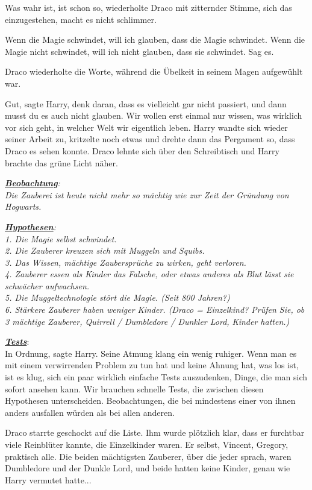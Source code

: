 \glqq{}Was wahr ist, ist schon so\grqq{}, wiederholte Draco mit zitternder
Stimme, \glqq{}sich das einzugestehen, macht es nicht schlimmer.\grqq{}

\glqq{}Wenn die Magie schwindet, will ich glauben, dass die Magie schwindet.
Wenn die Magie nicht schwindet, will ich nicht glauben, dass sie schwindet. Sag
es.\grqq{}

Draco wiederholte die Worte, während die Übelkeit in seinem Magen aufgewühlt
war.

\glqq{}Gut\grqq{}, sagte Harry, \glqq{}denk daran, dass es vielleicht gar nicht
passiert, und dann musst du es auch nicht glauben. Wir wollen erst einmal nur
wissen, was wirklich vor sich geht, in welcher Welt wir eigentlich leben.\grqq{}
Harry wandte sich wieder seiner Arbeit zu, kritzelte noch etwas und drehte dann
das Pergament so, dass Draco es sehen konnte. Draco lehnte sich über den
Schreibtisch und Harry brachte das grüne Licht näher.

\emph{\textbf{\underline{Beobachtung}}:\\
Die Zauberei ist heute nicht mehr so mächtig wie zur Zeit der Gründung von
Hogwarts.}

\emph{\textbf{\underline{Hypothesen}}:}\\
\emph{1. Die Magie selbst schwindet.\\
2. Die Zauberer kreuzen sich mit Muggeln und Squibs.\\
3. Das Wissen, mächtige Zaubersprüche zu wirken, geht verloren.\\
4. Zauberer essen als Kinder das Falsche, oder etwas anderes als Blut lässt sie
schwächer aufwachsen.\\
5. Die Muggeltechnologie stört die Magie. (Seit 800 Jahren?)\\
6. Stärkere Zauberer haben weniger Kinder. (Draco = Einzelkind? Prüfen Sie, ob 3
mächtige Zauberer, Quirrell / Dumbledore / Dunkler Lord, Kinder hatten.)}

\textbf{\emph{\underline{Tests}}}:\\
\glqq{}In Ordnung\grqq{}, sagte Harry. Seine Atmung klang ein wenig ruhiger.
\glqq{}Wenn man es mit einem verwirrenden Problem zu tun hat und keine Ahnung
hat, was los ist, ist es klug, sich ein paar wirklich einfache Tests
auszudenken, Dinge, die man sich sofort ansehen kann. Wir brauchen schnelle
Tests, die zwischen diesen Hypothesen unterscheiden. Beobachtungen, die bei
mindestens einer von ihnen anders ausfallen würden als bei allen anderen.\grqq{}

Draco starrte geschockt auf die Liste. Ihm wurde plötzlich klar, dass er
furchtbar viele Reinblüter kannte, die Einzelkinder waren. Er selbst, Vincent,
Gregory, praktisch alle. Die beiden mächtigsten Zauberer, über die jeder sprach,
waren Dumbledore und der Dunkle Lord, und beide hatten keine Kinder, genau wie
Harry vermutet hatte...

